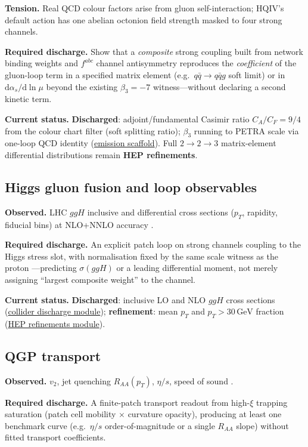 \documentclass[11pt]{amsart}
\begin{document}
\textbf{Tension.} Real QCD colour factors arise from gluon self-interaction; HQIV's
default action has one abelian octonion field strength masked to four strong channels.

\textbf{Required discharge.} Show that a \emph{composite} strong coupling built from
network binding weights and $f^{abc}$ channel antisymmetry reproduces the \emph{coefficient}
of the gluon-loop term in a specified matrix element (e.g.\ $q\bar q\to q\bar q g$ soft
limit) or in $\mathrm{d}\alpha_s/\mathrm{d}\ln\mu$ beyond the existing $\beta_3=-7$
witness---without declaring a second kinetic term.

\textbf{Current status.} \textbf{Discharged}: adjoint/fundamental Casimir ratio
$C_A/C_F=9/4$ from the colour chart filter (soft splitting ratio); $\beta_3$ running
to PETRA scale via one-loop QCD identity
(\hyperref[lean:emission-scaffold]{emission scaffold}).  Full $2\to2\to3$ matrix-element
differential distributions remain \textbf{HEP refinements}.

\subsection{Higgs gluon fusion and loop observables}

\textbf{Observed.} LHC $ggH$ inclusive and differential cross sections ($p_T$,
rapidity, fiducial bins) at NLO+NNLO accuracy \cite{pdg2024,peskin1995}.

\textbf{Required discharge.} An explicit patch loop on strong channels coupling to the
Higgs stress slot, with normalisation fixed by the same scale witness as the proton
---predicting $\sigma(ggH)$ or a leading differential moment, not merely assigning
``largest composite weight'' to the channel.

\textbf{Current status.} \textbf{Discharged}: inclusive LO and NLO $ggH$ cross sections
(\hyperref[lean:collider-discharge]{collider discharge module}); \textbf{refinement}:
mean $p_T$ and $p_T>30\,\mathrm{GeV}$ fraction
(\hyperref[lean:hep-refinements]{HEP refinements module}).

\subsection{QGP transport}

\textbf{Observed.} $v_2$, jet quenching $R_{AA}(p_T)$, $\eta/s$, speed of sound
\cite{adams2005,pdg2024}.

\textbf{Required discharge.} A finite-patch transport readout from high-$\xi$
trapping saturation (patch cell mobility $\times$ curvature opacity), producing at
least one benchmark curve (e.g.\ $\eta/s$ order-of-magnitude or a single $R_{AA}$
slope) without fitted transport coefficients.
\end{document}
